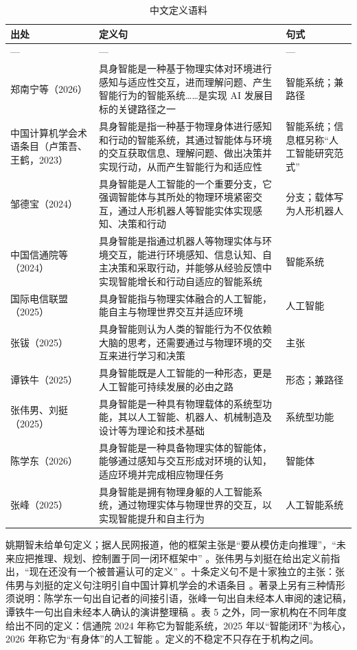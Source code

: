 \documentclass[10pt,fontset=fandol]{ctexart}
\begin{document}
\begin{table}[htbp]
\centering
\caption{中文定义语料}
\small
\begin{tabularx}{\textwidth}{>{\raggedright\arraybackslash}p{3.3cm}Y>{\raggedright\arraybackslash}p{2.6cm}}
\toprule
出处 & 定义句 & 句式 \\
\midrule
--- & --- & --- \\
郑南宁等（2026）\cite{zheng2026} & 具身智能是一种基于物理实体对环境进行感知与适应性交互，进而理解问题、产生智能行为的智能系统……是实现 AI 发展目标的关键路径之一 & 智能系统；兼路径 \\
中国计算机学会术语条目（卢策吾、王鹤，2023）\cite{ccf2023} & 具身智能是指一种基于物理身体进行感知和行动的智能系统，其通过智能体与环境的交互获取信息、理解问题、做出决策并实现行动，从而产生智能行为和适应性 & 智能系统；信息框另称“人工智能研究范式” \\
邹德宝（2024）\cite{kejiribao2024} & 具身智能是人工智能的一个重要分支，它强调智能体与其所处的物理环境紧密交互，通过人形机器人等智能实体实现感知、决策和行动 & 分支；载体写为人形机器人 \\
中国信通院等（2024）\cite{caict2024} & 具身智能是指通过机器人等物理实体与环境交互，能进行环境感知、信息认知、自主决策和采取行动，并能够从经验反馈中实现智能增长和行动自适应的智能系统 & 智能系统 \\
国际电信联盟（2025）\cite{itu2025} & 具身智能指与物理实体融合的人工智能，能自主与物理世界交互并适应环境 & 人工智能 \\
张钹（2025）\cite{zhangbo2025} & 具身智能则认为人类的智能行为不仅依赖大脑的思考，还需要通过与物理环境的交互来进行学习和决策 & 主张 \\
谭铁牛（2025）\cite{tantn2025} & 具身智能既是人工智能的一种形态，更是人工智能可持续发展的必由之路 & 形态；兼路径 \\
张伟男、刘挺（2025）\cite{zhangwei2025} & 具身智能是一种具有物理载体的系统型功能，其以人工智能、机器人、机械制造及设计等为理论和技术基础 & 系统型功能 \\
陈学东（2026）\cite{chenxd2026} & 具身智能是一种具备物理实体的智能体，能够通过感知与交互形成对环境的认知，适应环境并完成相应物理任务 & 智能体 \\
张峰（2025）\cite{zhangfeng2025} & 具身智能是拥有物理身躯的人工智能系统，通过物理实体与物理世界的交互，以实现智能提升和自主行为 & 人工智能系统 \\
\bottomrule
\end{tabularx}
\end{table}
姚期智未给单句定义；据人民网报道，他的框架主张是“要从模仿走向推理”，“未来应把推理、规划、控制置于同一闭环框架中” \cite{yao2025}。张伟男与刘挺在给出定义前指出，“现在还没有一个被普遍认可的定义” \cite{zhangwei2025}。十条定义句不是十家独立的主张：张伟男与刘挺的定义句注明引自中国计算机学会的术语条目 \cite{zhangwei2025,ccf2023}。著录上另有三种情形须说明：陈学东一句出自记者的间接引语，张峰一句出自未经本人审阅的速记稿，谭铁牛一句出自未经本人确认的演讲整理稿 \cite{chenxd2026,zhangfeng2025,tantn2025}。表 5 之外，同一家机构在不同年度给出不同的定义：信通院 2024 年称它为智能系统，2025 年以“智能闭环”为核心，2026 年称它为“有身体”的人工智能 \cite{caict2024,caict2025,caict2026}。定义的不稳定不只存在于机构之间。
\end{document}

